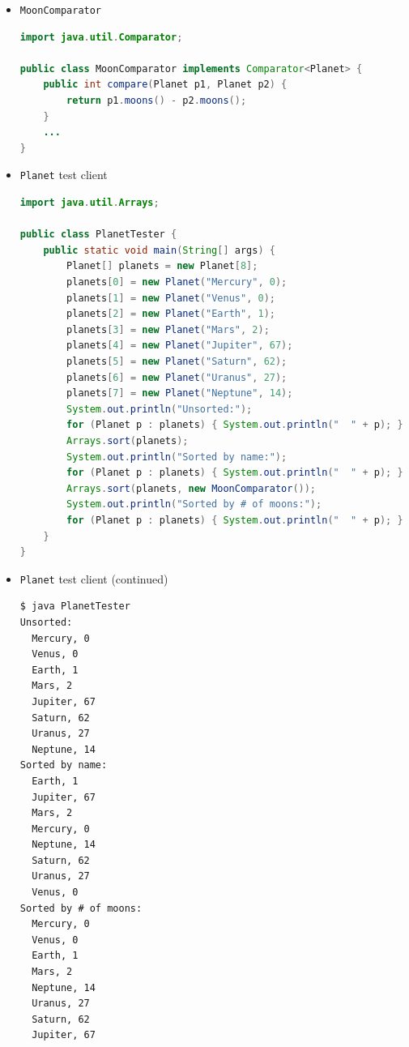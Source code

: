 \documentclass[8pt,a4paper,compress]{beamer}
\begin{document}
\begin{frame}[fragile]
\begin{itemize}
\item \lstinline{MoonComparator}
\begin{lstlisting}[language=Java]
import java.util.Comparator;

public class MoonComparator implements Comparator<Planet> {
    public int compare(Planet p1, Planet p2) { 
        return p1.moons() - p2.moons(); 
    }
    ...
}
\end{lstlisting}

\item \lstinline{Planet} test client
\begin{lstlisting}[language=Java]
import java.util.Arrays;

public class PlanetTester {
    public static void main(String[] args) {
        Planet[] planets = new Planet[8];
        planets[0] = new Planet("Mercury", 0);
        planets[1] = new Planet("Venus", 0);
        planets[2] = new Planet("Earth", 1);
        planets[3] = new Planet("Mars", 2);
        planets[4] = new Planet("Jupiter", 67);
        planets[5] = new Planet("Saturn", 62);
        planets[6] = new Planet("Uranus", 27);
        planets[7] = new Planet("Neptune", 14);
        System.out.println("Unsorted:");
        for (Planet p : planets) { System.out.println("  " + p); }
        Arrays.sort(planets);
        System.out.println("Sorted by name:");
        for (Planet p : planets) { System.out.println("  " + p); }
        Arrays.sort(planets, new MoonComparator());
        System.out.println("Sorted by # of moons:");
        for (Planet p : planets) { System.out.println("  " + p); }
    }
}
\end{lstlisting}
\end{itemize}
\end{frame}

\begin{frame}[fragile]
\begin{itemize}
\item \lstinline{Planet} test client (continued)
\begin{lstlisting}[language={}]
$ java PlanetTester 
Unsorted:
  Mercury, 0
  Venus, 0
  Earth, 1
  Mars, 2
  Jupiter, 67
  Saturn, 62
  Uranus, 27
  Neptune, 14
Sorted by name:
  Earth, 1
  Jupiter, 67
  Mars, 2
  Mercury, 0
  Neptune, 14
  Saturn, 62
  Uranus, 27
  Venus, 0
Sorted by # of moons:
  Mercury, 0
  Venus, 0
  Earth, 1
  Mars, 2
  Neptune, 14
  Uranus, 27
  Saturn, 62
  Jupiter, 67
\end{lstlisting}
\end{itemize}
\end{frame}
\end{document}
